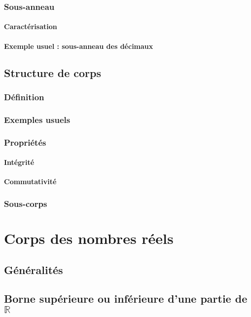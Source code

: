 \documentclass[12pt,a4paper,french]{book}
\begin{document}
\begin{spacing}{1.0}
		\subsection{Sous-anneau}
			\subsubsection{Caractérisation}
			\subsubsection{Exemple usuel : sous-anneau des décimaux}
	\section{Structure de corps}
		\subsection{Définition}
		\subsection{Exemples usuels}
		\subsection{Propriétés}
			\subsubsection{Intégrité}
			\subsubsection{Commutativité}
		\subsection{Sous-corps}
	\end{spacing}
	
	
	
\chapter{Corps des nombres réels}
	\section{Généralités}
	\section{Borne supérieure ou inférieure d'une partie de $\mathbb{R}$}
\end{document}
